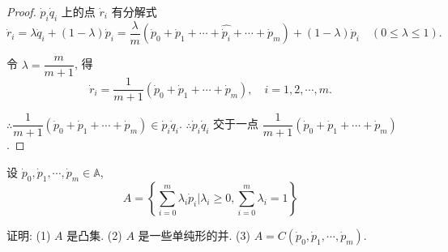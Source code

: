 \documentclass{ctexart}
\begin{document}
\begin{proof}
    $\dot{p}_i\dot{q}_i$ 上的点 $\dot{r}_i$ 有分解式
    \[\dot{r}_i=\lambda\dot{q}_i+(1-\lambda)\dot{p}_i=\dfrac{\lambda}{m}(\dot{p}_0+\dot{p}_1+\cdots+\widehat{\dot{p}_i}+\cdots+\dot{p}_m)+(1-\lambda)\dot{p}_i\quad(0\leq\lambda\leq1).\]

    令 $\lambda=\dfrac{m}{m+1}$, 得
    \[\dot{r}_i=\dfrac{1}{m+1}(\dot{p}_0+\dot{p}_1+\cdots+\dot{p}_m),\quad i=1,2,\cdots,m.\]

    $\therefore\dfrac{1}{m+1}(\dot{p}_0+\dot{p}_1+\cdots+\dot{p}_m)\in\dot{p}_i\dot{q}_i$. $\therefore\dot{p}_i\dot{q}_i$ 交于一点 $\dfrac{1}{m+1}(\dot{p}_0+\dot{p}_1+\cdots+\dot{p}_m)$.
\end{proof}
\begin{exercisec}%
    设 $\dot{p}_0,\dot{p}_1,\cdots,\dot{p}_m\in\mathbb{A}$,
    \[A=\left\{\sum\limits_{i=0}^m\lambda_i\dot{p}_i\Bigg|\lambda_i\geq0,\sum\limits_{i=0}^m\lambda_i=1\right\}\]
    
    证明: (1) $A$ 是凸集. (2) $A$ 是一些单纯形的并. (3) $A=C(\dot{p}_0,\dot{p}_1,\cdots,\dot{p}_m)$.
\end{exercisec}
\end{document}
